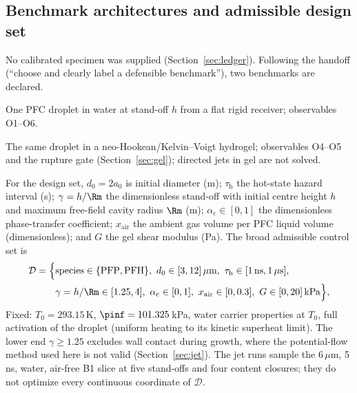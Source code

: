 \subsection{Benchmark architectures and admissible design set}\label{sec:benchmark}
No calibrated specimen was supplied (Section~\ref{sec:ledger}). Following the handoff
(``choose and clearly label a defensible benchmark''), two benchmarks are declared.
\begin{description}[leftmargin=0.6cm]
\item[B1 (liquid carrier, rigid receiver).] One PFC droplet in water at stand-off $h$ from a flat rigid
receiver; observables O1--O6.
\item[B2 (gel-embedded).] The same droplet in a neo-Hookean/Kelvin--Voigt hydrogel; observables O4--O5
and the rupture gate (Section~\ref{sec:gel}); directed jets in gel are not solved.
\end{description}
For the design set, $d_0=2a_0$ is initial diameter (m); $\tau_{\mathrm h}$ the hot-state hazard
interval (s); $\gamma=h/\Rm$ the dimensionless stand-off with initial centre height $h$ and
maximum free-field cavity radius $\Rm$ (m); $\alpha_{\mathrm c}\in[0,1]$ the dimensionless
phase-transfer coefficient; $x_{\mathrm{air}}$ the ambient gas volume per PFC liquid volume
(dimensionless); and $G$ the gel shear modulus (Pa). The broad admissible control set is
\begin{equation}
\begin{aligned}
\mathcal D=\Bigl\{&\text{species}\in\{\mathrm{PFP},\mathrm{PFH}\},\ d_0\in[3,12]\,\mu\mathrm m,\
\tau_{\mathrm h}\in[1\,\mathrm{ns},1\,\mu\mathrm s],\\
&\gamma=h/\Rm\in[1.25,4],\ \alpha_{\mathrm c}\in[0,1],\ x_{\mathrm{air}}\in[0,0.3],\ G\in[0,20]\,\mathrm{kPa}\Bigr\},
\end{aligned}\label{eq:design}
\end{equation}
Fixed: $T_0=293.15$\,K,
$\pinf=101.325$\,kPa, water carrier properties at $T_0$, full activation of the droplet (uniform
heating to its kinetic superheat limit). The lower end $\gamma\ge1.25$ excludes wall contact during
growth, where the potential-flow method used here is not valid (Section~\ref{sec:jet}).
The jet runs sample the 6\,$\mu$m, 5\,ns, water, air-free B1 slice at five stand-offs
and four content closures; they do not optimize every continuous coordinate of $\mathcal D$.

